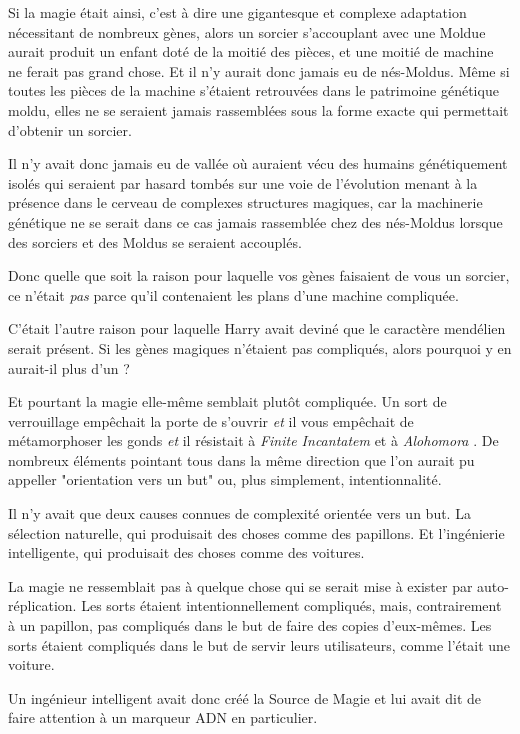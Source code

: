 Si la magie était ainsi, c'est à dire une gigantesque et complexe adaptation nécessitant de nombreux gènes, alors un sorcier s'accouplant avec une Moldue aurait produit un enfant doté de la moitié des pièces, et une moitié de machine ne ferait pas grand chose. Et il n'y aurait donc jamais eu de nés-Moldus. Même si toutes les pièces de la machine s'étaient retrouvées dans le patrimoine génétique moldu, elles ne se seraient jamais rassemblées sous la forme exacte qui permettait d'obtenir un sorcier.

Il n'y avait donc jamais eu de vallée où auraient vécu des humains génétiquement isolés qui seraient par hasard tombés sur une voie de l'évolution menant à la présence dans le cerveau de complexes structures magiques, car la machinerie génétique ne se serait dans ce cas jamais rassemblée chez des nés-Moldus lorsque des sorciers et des Moldus se seraient accouplés.

Donc quelle que soit la raison pour laquelle vos gènes faisaient de vous un sorcier, ce n'était \emph{pas} parce qu'il contenaient les plans d'une machine compliquée.

C'était l'autre raison pour laquelle Harry avait deviné que le caractère mendélien serait présent. Si les gènes magiques n'étaient pas compliqués, alors pourquoi y en aurait-il plus d'un ?

Et pourtant la magie elle-même semblait plutôt compliquée. Un sort de verrouillage empêchait la porte de s'ouvrir \emph{et}  il vous empêchait de métamorphoser les gonds \emph{et}  il résistait à \emph{Finite Incantatem } et à \emph{Alohomora} . De nombreux éléments pointant tous dans la même direction que l'on aurait pu appeller "orientation vers un but" ou, plus simplement, intentionnalité.

Il n'y avait que deux causes connues de complexité orientée vers un but. La sélection naturelle, qui produisait des choses comme des papillons. Et l'ingénierie intelligente, qui produisait des choses comme des voitures.

La magie ne ressemblait pas à quelque chose qui se serait mise à exister par auto-réplication. Les sorts étaient intentionnellement compliqués, mais, contrairement à un papillon, pas compliqués dans le but de faire des copies d'eux-mêmes. Les sorts étaient compliqués dans le but de servir leurs utilisateurs, comme l'était une voiture.

Un ingénieur intelligent avait donc créé la Source de Magie et lui avait dit de faire attention à un marqueur ADN en particulier.

